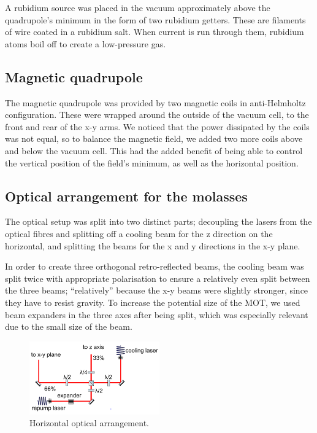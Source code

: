 \documentclass[11pt,twoside,a4paper]{article}
\begin{document}
A rubidium source was placed in the vacuum approximately above the quadrupole's minimum in the form of two rubidium getters. These are filaments of wire coated in a rubidium salt. When current is run
through them, rubidium atoms boil off to create a low-pressure gas.
\subsection{Magnetic quadrupole}
The magnetic quadrupole was provided by two magnetic coils in anti-Helmholtz configuration. These were wrapped around the outside of the vacuum cell, to the front and rear of the x-y arms.
We noticed that the power dissipated by the coils was not equal, so to balance the magnetic field, we added two more coils above and below the vacuum cell. This had the added benefit of being able to
control the vertical position of the field's minimum, as well as the horizontal position.
\subsection{Optical arrangement for the molasses}
The optical setup was split into two distinct parts; decoupling the lasers from the optical fibres and splitting off a cooling beam for the z direction on the horizontal, and splitting the beams for the
x and y directions in the x-y plane.

In order to create three orthogonal retro-reflected beams, the cooling beam was split twice with appropriate polarisation to ensure a relatively even split between the three beams; ``relatively'' because
the x-y beams were slightly stronger, since they have to resist gravity. To increase the potential size of the MOT, we used beam expanders in the three axes after being split, which was especially relevant
due to the small size of the beam.
\begin{figure}[h]
    \centering
    \includegraphics[width=0.5\textwidth]{images/horiz}
    \caption{Horizontal optical arrangement.}
\end{figure}
\end{document}
